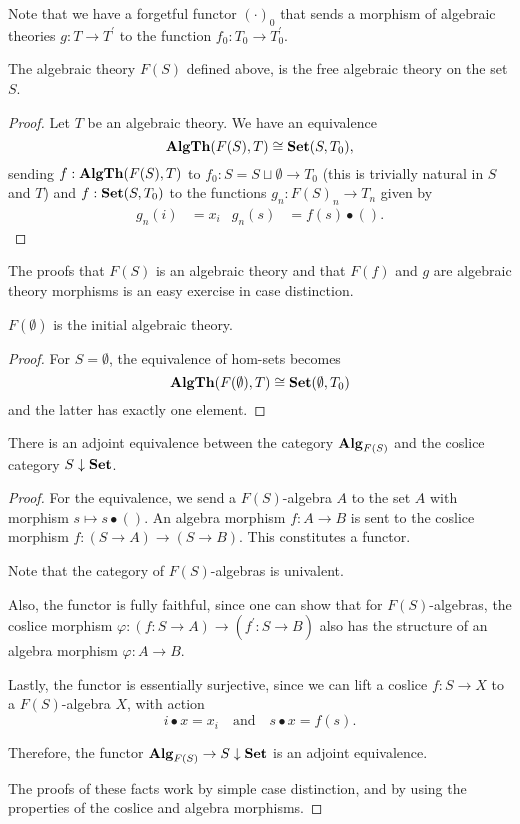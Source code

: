 Note that we have a forgetful functor $ (\cdot)_0 $ that sends a morphism of algebraic theories $ g: T \to T^\prime $ to the function $ f_0: T_0 \to T^\prime_0 $.

\begin{lemma}
  The algebraic theory $ F(S) $ defined above, is the free algebraic theory on the set $ S $.
\end{lemma}
\begin{proof}
  Let $ T $ be an algebraic theory. We have an equivalence
  \[ \mathbf{AlgTh}(F(S), T) \cong \mathbf{Set}(S, T_0), \]
  sending $ f: \mathbf{AlgTh}(F(S), T) $ to $ f_0: S = S \sqcup \emptyset \to T_0 $ (this is trivially natural in $ S $ and $ T $) and $ f: \mathbf{Set}(S, T_0) $ to the functions $ g_n: F(S)_n \to T_n $ given by
  \begin{align*}
    g_n(i) &= x_i & g_n(s) &= f(s) \bullet ().
  \end{align*}
\end{proof}

The proofs that $ F(S) $ is an algebraic theory and that $ F(f) $ and $ g $ are algebraic theory morphisms is an easy exercise in case distinction.

\begin{corollary}
  $ F(\emptyset) $ is the initial algebraic theory.
\end{corollary}
\begin{proof}
  For $ S = \emptyset $, the equivalence of hom-sets becomes
  \[ \mathbf{AlgTh}(F(\emptyset), T) \cong \mathbf{Set}(\emptyset, T_0) \]
  and the latter has exactly one element.
\end{proof}

\begin{lemma}
  There is an adjoint equivalence between the category $ \mathbf{Alg}_{F(S)} $ and the coslice category $ S \downarrow \mathbf{Set} $.
\end{lemma}
\begin{proof}
  For the equivalence, we send a $ F(S) $-algebra $ A $ to the set $ A $ with morphism $ s \mapsto s \bullet () $. An algebra morphism $ f: A \to B $ is sent to the coslice morphism $ f: (S \to A) \to (S \to B) $. This constitutes a functor.

  Note that the category of $ F(S) $-algebras is univalent.

  Also, the functor is fully faithful, since one can show that for $ F(S) $-algebras, the coslice morphism $ \varphi: (f: S \to A) \to (f^\prime: S \to B) $ also has the structure of an algebra morphism $ \varphi: A \to B $.

  Lastly, the functor is essentially surjective, since we can lift a coslice $ f: S \to X $ to a $ F(S) $-algebra $ X $, with action
  \[ i \bullet x = x_i \quad \text{and} \quad s \bullet x = f(s). \]

  Therefore, the functor $ \mathbf{Alg}_{F(S)} \to S \downarrow \mathbf{Set} $ is an adjoint equivalence.

  The proofs of these facts work by simple case distinction, and by using the properties of the coslice and algebra morphisms.
\end{proof}

